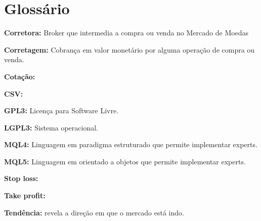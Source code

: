 \chapter{Glossário}

\textbf{Corretora:} Broker que intermedia a compra ou venda no Mercado de Moedas

\textbf{Corretagem:} Cobrança em valor monetário por alguma operação de compra ou venda.

\textbf{Cotação:}

\textbf{CSV:}

\textbf{GPL3:} Licença para  Software Livre.

\textbf{LGPL3:} Sistema operacional.

\textbf{MQL4:} Linguagem em paradigma estruturado que permite implementar experts.

\textbf{MQL5:} Linguagem em orientado a objetos que permite implementar experts.

\textbf{Stop loss:}

\textbf{Take profit:}

\textbf{Tendência:} revela a direção em que o mercado está indo.